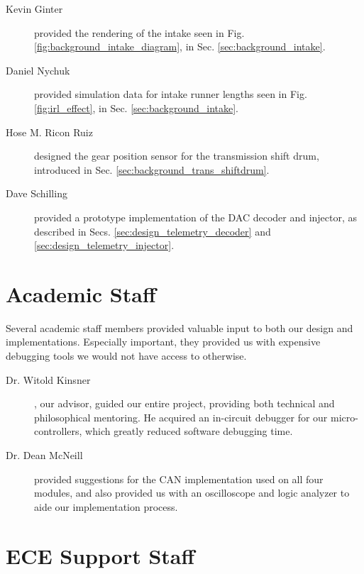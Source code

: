 \begin{description}

\item[Kevin Ginter] provided the rendering of the intake seen in Fig. \ref{fig:background_intake_diagram}, in Sec. \ref{sec:background_intake}.

\item[Daniel Nychuk] provided simulation data for intake runner lengths seen in Fig. \ref{fig:irl_effect}, in Sec. \ref{sec:background_intake}. 

\item[Hose M. Ricon Ruiz] designed the gear position sensor for the transmission shift drum, introduced in Sec. \ref{sec:background_trans_shiftdrum}.

\item[Dave Schilling] provided a prototype implementation of the DAC decoder and injector, as described in Secs. \ref{sec:design_telemetry_decoder} and \ref {sec:design_telemetry_injector}.

\end{description}

\section*{Academic Staff}

Several academic staff members provided valuable input to both our design and implementations. Especially important, they provided us with expensive debugging tools we would not have access to otherwise.

\begin{description}

\item[Dr. Witold Kinsner], our advisor, guided our entire project, providing both technical and philosophical mentoring. He acquired an in-circuit debugger for our micro-controllers, which greatly reduced software debugging time.

\item[Dr. Dean McNeill] provided suggestions for the CAN implementation used on all four modules, and also provided us with an oscilloscope and logic analyzer to aide our implementation process.

\end{description}

\section*{ECE Support Staff}


